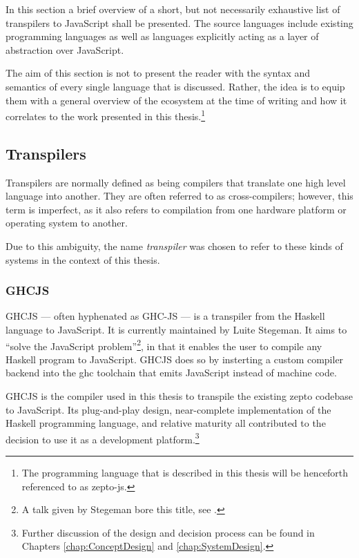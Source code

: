 \documentclass[oneside,11pt,xetex]{scrbook}
\begin{document}
In this section a brief overview of a short, but not necessarily exhaustive list of
transpilers to JavaScript shall be presented. The source languages include
existing programming languages as well as languages explicitly acting as
a layer of abstraction over JavaScript.

The aim of this section is not to present the reader with the syntax and semantics
of every single language that is discussed. Rather, the idea is to equip them with a
general overview of the ecosystem at the time of writing and how it correlates to
the work presented in this thesis.\footnote{The programming language that is described
in this thesis will be henceforth referenced to as zepto-js.}

\subsection{Transpilers}
\label{trans}

Transpilers are normally defined as being compilers that translate one high level language
into another. They are often referred to as cross-compilers; however, this term is imperfect,
as it also refers to compilation from one hardware platform or operating system to
another.

Due to this ambiguity, the name \textit{transpiler} was chosen to refer to these
kinds of systems in the context of this thesis.

\subsubsection{GHCJS}
\label{sec:GHCJS}

GHCJS --- often hyphenated as GHC-JS --- is a transpiler from the Haskell language
to JavaScript. It is currently maintained by Luite Stegeman. It aims to ``solve
the JavaScript problem''\footnote{A talk given by Stegeman bore this title, see
\parencite{STEG}.}, in that it enables the user to compile any Haskell program to JavaScript.
GHCJS does so by insterting a custom compiler backend into the \gls{ghc} toolchain
that emits JavaScript instead of machine code.

GHCJS is the compiler used in this thesis to transpile the existing zepto codebase
to JavaScript. Its plug-and-play design, near-complete implementation of the
Haskell programming language, and relative maturity all contributed to the decision
to use it as a development platform.\footnote{Further discussion of the design
and decision process can be found in Chapters \ref{chap:ConceptDesign} and
\ref{chap:SystemDesign}.}
\end{document}
